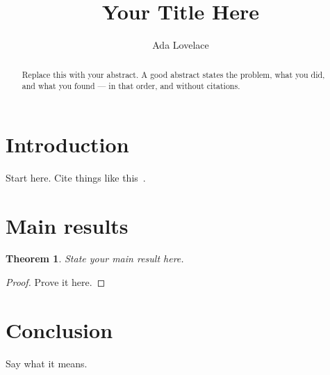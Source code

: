 \documentclass[english]{smfart}
\title{Your Title Here}
\author{Ada Lovelace}
\newtheorem{theorem}{Theorem}
\begin{document}
\begin{abstract}
Replace this with your abstract. A good abstract states the problem, what
you did, and what you found --- in that order, and without citations.
\end{abstract}

\maketitle

\section{Introduction}
Start here. Cite things like this~\cite{knuth1984texbook}.

\section{Main results}
\label{sec:results}

\begin{theorem}
\label{thm:main}
State your main result here.
\end{theorem}

\begin{proof}
Prove it here.
\end{proof}

\section{Conclusion}
Say what it means.



\end{document}
